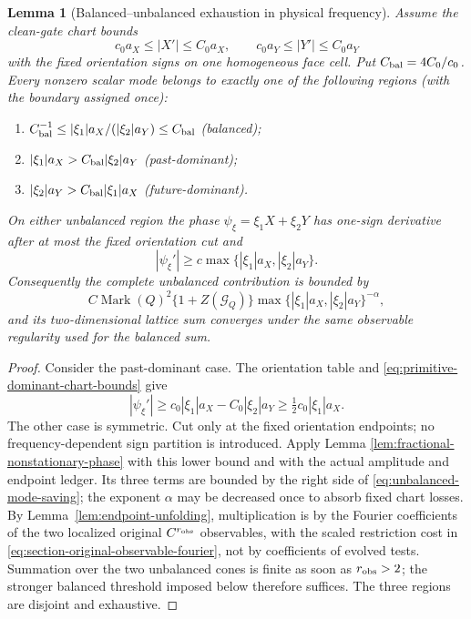 \documentclass[11pt]{article}
\newtheorem{lemma}[theorem]{Lemma}
\begin{document}
\begin{lemma}[Balanced--unbalanced exhaustion in physical frequency]
\label{lem:balanced-unbalanced-exhaustion}
Assume the clean-gate chart bounds
\begin{equation}
\label{eq:primitive-dominant-chart-bounds}
 c_0a_X\le |X'|\le C_0a_X,\qquad
 c_0a_Y\le |Y'|\le C_0a_Y
\end{equation}
with the fixed orientation signs on one homogeneous face cell.  Put
$C_{\rm bal}=4C_0/c_0$.  Every nonzero scalar mode belongs to exactly one of
the following regions (with the boundary assigned once):
\begin{enumerate}[label=\textup{(\roman*)}]
\item $C_{\rm bal}^{-1}\le
 |\xi_1|a_X/(|\xi_2|a_Y)\le C_{\rm bal}$ (balanced);
\item $|\xi_1|a_X>C_{\rm bal}|\xi_2|a_Y$ (past-dominant);
\item $|\xi_2|a_Y>C_{\rm bal}|\xi_1|a_X$ (future-dominant).
\end{enumerate}
On either unbalanced region the phase
$\psi_\xi=\xi_1X+\xi_2Y$ has one-sign derivative after at most the fixed
orientation cut and
\begin{equation}
\label{eq:unbalanced-derivative-lower-bound}
 |\psi_\xi'|\ge c\max\{|\xi_1|a_X,|\xi_2|a_Y\}.
\end{equation}
Consequently the complete unbalanced contribution is bounded by
\begin{equation}
\label{eq:unbalanced-mode-saving}
 C\operatorname{Mark}(Q)^2\{1+Z(\mathcal G_Q)\}
 \max\{|\xi_1|a_X,|\xi_2|a_Y\}^{-\alpha},
\end{equation}
and its two-dimensional lattice sum converges under the same observable
regularity used for the balanced sum.
\end{lemma}

\begin{proof}
Consider the past-dominant case.  The orientation table and
\eqref{eq:primitive-dominant-chart-bounds} give
\[
 |\psi_\xi'|
 \ge c_0|\xi_1|a_X-C_0|\xi_2|a_Y
 \ge \tfrac12c_0|\xi_1|a_X.
\]
The other case is symmetric.  Cut only at the fixed orientation endpoints;
no frequency-dependent sign partition is introduced.  Apply Lemma
\ref{lem:fractional-nonstationary-phase} with this lower bound and with the
actual amplitude and endpoint ledger.  Its three terms are bounded by the
right side of \eqref{eq:unbalanced-mode-saving}; the exponent $\alpha$ may be
decreased once to absorb fixed chart losses.  By
Lemma~\ref{lem:endpoint-unfolding}, multiplication is by the Fourier
coefficients of the two localized original $C^{r_{\rm obs}}$ observables,
with the scaled restriction cost in
\eqref{eq:section-original-observable-fourier}, not by coefficients of
evolved tests.  Summation over the two
unbalanced cones is finite as soon as $r_{\rm obs}>2$; the stronger balanced
threshold imposed below therefore suffices.  The three regions are disjoint
and exhaustive.
\end{proof}
\end{document}
